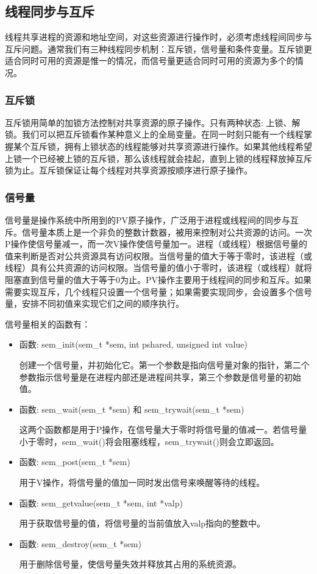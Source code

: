 \documentclass[12pt, a4paper, oneside]{ctexbook}
\numberwithin{figure}{section}
\begin{document}
\subsection{线程同步与互斥}

线程共享进程的资源和地址空间，对这些资源进行操作时，必须考虑线程间同步与互斥问题。通常我们有三种线程同步机制：互斥锁，信号量和条件变量。互斥锁更适合同时可用的资源是惟一的情况，而信号量更适合同时可用的资源为多个的情况。

\subsubsection{互斥锁}
互斥锁用简单的加锁方法控制对共享资源的原子操作。只有两种状态: 上锁、解锁。我们可以把互斥锁看作某种意义上的全局变量。在同一时刻只能有一个线程掌握某个互斥锁，拥有上锁状态的线程能够对共享资源进行操作。如果其他线程希望上锁一个已经被上锁的互斥锁，那么该线程就会挂起，直到上锁的线程释放掉互斥锁为止。互斥锁保证让每个线程对共享资源按顺序进行原子操作。

\subsubsection{信号量}
信号量是操作系统中所用到的PV原子操作，广泛用于进程或线程间的同步与互斥。信号量本质上是一个非负的整数计数器，被用来控制对公共资源的访问。一次P操作使信号量减一，而一次V操作使信号量加一。进程（或线程）根据信号量的值来判断是否对公共资源具有访问权限。当信号量的值大于等于零时，该进程（或线程）具有公共资源的访问权限。当信号量的值小于零时，该进程（或线程）就将阻塞直到信号量的值大于等于0为止。PV操作主要用于线程间的同步和互斥。如果需要实现互斥，几个线程只设置一个信号量；如果需要实现同步，会设置多个信号量，安排不同初值来实现它们之间的顺序执行。

信号量相关的函数有：
\begin{itemize}
    \item 函数: sem\_init(sem\_t *sem, int pshared, unsigned int value) 

    创建一个信号量，并初始化它。第一个参数是指向信号量对象的指针，第二个参数指示信号量是在进程内部还是进程间共享，第三个参数是信号量的初始值。

    \item 函数: sem\_wait(sem\_t *sem) 和 sem\_trywait(sem\_t *sem)

    这两个函数都是用于P操作，在信号量大于零时将信号量的值减一。若信号量小于零时，sem\_wait()将会阻塞线程，sem\_trywait()则会立即返回。

    \item 函数: sem\_post(sem\_t *sem)

    用于V操作，将信号量的值加一同时发出信号来唤醒等待的线程。

    \item 函数: sem\_getvalue(sem\_t *sem, int *valp)

    用于获取信号量的值，将信号量的当前值放入valp指向的整数中。

    \item 函数: sem\_destroy(sem\_t *sem)

    用于删除信号量，使信号量失效并释放其占用的系统资源。
\end{itemize}
\end{document}

